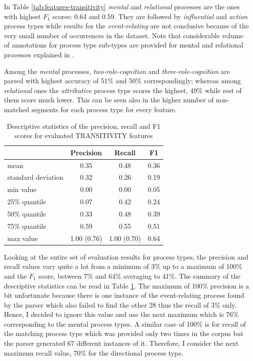     In Table \ref{tab:features-transitivity} \textit{mental} and \textit{relational} processes are the ones with highest $F_1$ scores: 0.64 and 0.59. They are followed by \textit{influential} and \textit{action} process types while results for the \textit{event-relating} are not conclusive because of the very small number of occurrences in the dataset. 
    Note that considerable volume of annotations for process type sub-types are provided for mental and relational processes explained in \citet[153-155]{schulz2015me}.
    
    Among the \textit{mental} processes, \textit{two-role-cognition} and \textit{three-role-cognition} are parsed with highest accuracy of 51\% and 50\% correspondingly; whereas among \textit{relational} ones the \textit{attributive} process type scores the highest, 49\% while rest of them score much lower. This can be seen also in the higher number of  non-matched segments for each process type for every feature.
    
    \begin{table}[!ht]
    \centering
    \begin{tabular}{lccc}
        \toprule
        {} & {Precision} & {Recall} & {F1} \\ %
        \midrule
        mean & 0.35 & 0.48 & 0.36 \\
        standard deviation & 0.32 & 0.26 & 0.19 \\
        min value & 0.00 & 0.00 & 0.05 \\
        25\% quantile & 0.07 & 0.42 & 0.24 \\
        50\% quantile & 0.33 & 0.48 & 0.39 \\
        75\% quantile & 0.59 & 0.55 & 0.51 \\
        max value & 1.00 (0.76) & 1.00 (0.70) & 0.64 \\
        \bottomrule
    \end{tabular}
    \caption{Descriptive statistics of the precision, recall and F1 scores for evaluated TRANSITIVITY features}
    \label{tab:transitivity-accuracy}
    \end{table}
    
    Looking at the entire set of evaluation results for process types, the precision and recall values vary quite a lot from a minimum of 3\% up to a maximum of 100\% and the $F_1$ score, between 7\% and 64\%  averaging to 41\%. The summary of the descriptive statistics can be read in Table \ref{tab:transitivity-accuracy}. The maximum of 100\% precision is a bit unfortunate because there is one instance of the event-relating process found by the parser which also failed to find the other 28 thus the recall of 3\% only. Hence, I decided to ignore this value and use the next maximum which is 76\% corresponding to the mental process types. A similar case of 100\% is for recall of the matching process type which was provided only two times in the corpus but the parser generated 67 different instances of it. Therefore, I consider the next maximum recall value, 70\%  for the directional process type. 
    
